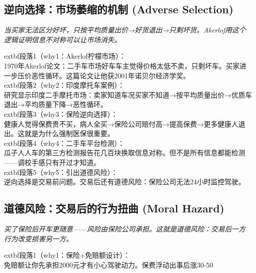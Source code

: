 \documentclass[openany, a4paper, 12pt]{book}
\newenvironment{motivation}{
	\vspace{0.5em}
	\begin{tcolorbox}[
		colback=gray!10,           %
		colframe=gray!60,          %
		title=\textit{本章动机 (Motivation)},
		fonttitle=\bfseries,
		arc=0mm,                   %
		leftrule=3mm               %
		]
		\small \itshape %
	}{
	\end{tcolorbox}
	\vspace{1em}
}
\begin{document}
	\subsection{逆向选择：市场萎缩的机制 (Adverse Selection)}
	\begin{motivation}当买家无法区分好坏，只按平均质量出价→好货退出→只剩坏货。Akerlof用这个逻辑证明信息不对称可以让市场消失。\end{motivation}
		extbf{段落1（why1：Akerlof柠檬市场）}：\\1970年Akerlof论文：二手车市场好车车主觉得价格太低不卖，只剩坏车。买家进一步压价恶性循环。这篇论文让他获2001年诺贝尔经济学奖。\\	extbf{段落2（why2：印度摩托车案例）}：\\研究显示印度二手摩托市场：卖家知道车况买家不知道→按平均质量出价→优质车退出→平均质量下降→恶性循环。\\	extbf{段落3（why3：保险逆向选择）}：\\健康人觉得保费贵不买，病人全买→保险公司赔付高→提高保费→更多健康人退出。这就是为什么强制医保很重要。\\	extbf{段落4（why4：二手车平台检测）}：\\瓜子人人车的第三方检测报告花几百块换取信息对称。但不是所有信息都能检测——调校手感只有开过才知道。\\	extbf{段落5（why5：引出道德风险）}：\\逆向选择是交易前问题。交易后还有道德风险：保险公司无法24小时监控驾驶。

	\subsection{道德风险：交易后的行为扭曲 (Moral Hazard)}
	\begin{motivation}买了保险后开车更随意——风险由保险公司承担。这就是道德风险：交易后一方行为改变损害另一方。\end{motivation}
		extbf{段落1（why1：保险+免赔额设计）}：\\免赔额让你先承担2000元才有小心驾驶动力。保费浮动出事后涨30-50%
\end{document}
